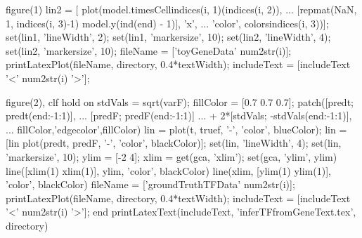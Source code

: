 \begin{frame}
\begin{octave}
  figure(1)
  lin2 = [ plot(model.timesCell{indices(i, 1)}(indices(i, 2)), ...
               [repmat(NaN, 1, indices(i, 3)-1) model.y(ind(end) - 1)], 'x', ...
               'color', colors{indices(i, 3)})];
  set(lin1, 'lineWidth', 2);
  set(lin1, 'markersize', 10);
  set(lin2, 'lineWidth', 4);
  set(lin2, 'markersize', 10);
  fileName = ['toyGeneData' num2str(i)];
  printLatexPlot(fileName, directory, 0.4*textWidth);
  includeText = [includeText '\only<' num2str(i) '>{\hfill}'];
   
  figure(2), clf  
  hold on
  stdVals = sqrt(varF);
  fillColor = [0.7 0.7 0.7];
  patch([predt; predt(end:-1:1)], ...
        [predF; predF(end:-1:1)] ...
        + 2*[stdVals; -stdVals(end:-1:1)], ...
            fillColor,'edgecolor',fillColor)
  lin = plot(t, truef, '-', 'color', blueColor);  
  lin = [lin plot(predt, predF, '-', 'color', blackColor)];
  set(lin, 'lineWidth', 4);
  set(lin, 'markersize', 10);
  ylim = [-2 4];
  xlim = get(gca, 'xlim');
  set(gca, 'ylim', ylim)
  line([xlim(1) xlim(1)], ylim, 'color', blackColor)
  line(xlim, [ylim(1) ylim(1)], 'color', blackColor)
  fileName = ['groundTruthTFData' num2str(i)];
  printLatexPlot(fileName, directory, 0.4*textWidth);
  includeText = [includeText '\only<' num2str(i) '>{\hfill}'];
end
    printLatexText(includeText, 'inferTFfromGeneText.tex', directory)

\end{octave}
\vspace{2cm}

\end{frame}






